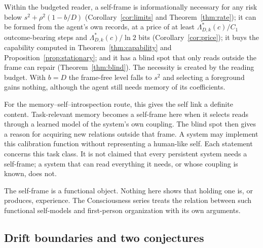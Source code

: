 \documentclass[12pt]{article}
\theoremstyle{definition}
\begin{document}
Within the budgeted reader, a self-frame is informationally necessary for any risk below $s^2+\rho^2(1-b/D)$ (Corollary~\ref{cor:limits} and Theorem~\ref{thm:rate}); it can be formed from the agent's own records, at a price of at least $\Lambda^*_{D,k}(c)/C_1$ outcome-bearing steps and $\Lambda^*_{D,k}(c)/\ln2$ bits (Corollary~\ref{cor:price}); it buys the capability computed in Theorem~\ref{thm:capability} and Proposition~\ref{prop:stationary}; and it has a blind spot that only reads outside the frame can repair (Theorem~\ref{thm:blind}). The necessity is created by the reading budget. With $b=D$ the frame-free level falls to $s^2$ and selecting a foreground gains nothing, although the agent still needs memory of its coefficients.

For the memory--self--introspection route, this gives the self link a definite content. Task-relevant memory becomes a self-frame here when it selects reads through a learned model of the system's own coupling. The blind spot then gives a reason for acquiring new relations outside that frame. A system may implement this calibration function without representing a human-like self. Each statement concerns this task class. It is not claimed that every persistent system needs a self-frame; a system that can read everything it needs, or whose coupling is known, does not.

The self-frame is a functional object. Nothing here shows that holding one is, or produces, experience. The Consciousness series treats the relation between such functional self-models and first-person organization with its own arguments.

\subsection{Drift boundaries and two conjectures}
\end{document}
